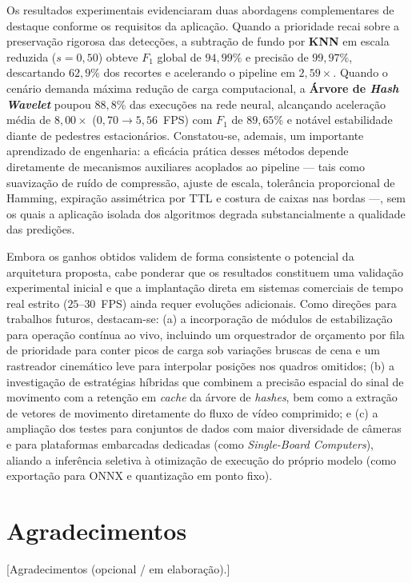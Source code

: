 \documentclass{ieeeaccess}
\begin{document}
Os resultados experimentais evidenciaram duas abordagens complementares de destaque conforme os requisitos da aplicação. Quando a prioridade recai sobre a preservação rigorosa das detecções, a subtração de fundo por \textbf{KNN} em escala reduzida ($s=0{,}50$) obteve $F_1$ global de $94{,}99\%$ e precisão de $99{,}97\%$, descartando $62{,}9\%$ dos recortes e acelerando o pipeline em $2{,}59\times$. Quando o cenário demanda máxima redução de carga computacional, a \textbf{Árvore de \textit{Hash Wavelet}} poupou $88{,}8\%$ das execuções na rede neural, alcançando aceleração média de $8{,}00\times$ ($0{,}70 \to 5{,}56$~FPS) com $F_1$ de $89{,}65\%$ e notável estabilidade diante de pedestres estacionários. Constatou-se, ademais, um importante aprendizado de engenharia: a eficácia prática desses métodos depende diretamente de mecanismos auxiliares acoplados ao pipeline --- tais como suavização de ruído de compressão, ajuste de escala, tolerância proporcional de Hamming, expiração assimétrica por TTL e costura de caixas nas bordas ---, sem os quais a aplicação isolada dos algoritmos degrada substancialmente a qualidade das predições.

Embora os ganhos obtidos validem de forma consistente o potencial da arquitetura proposta, cabe ponderar que os resultados constituem uma validação experimental inicial e que a implantação direta em sistemas comerciais de tempo real estrito ($25$--$30$~FPS) ainda requer evoluções adicionais. Como direções para trabalhos futuros, destacam-se: (a) a incorporação de módulos de estabilização para operação contínua ao vivo, incluindo um orquestrador de orçamento por fila de prioridade para conter picos de carga sob variações bruscas de cena e um rastreador cinemático leve para interpolar posições nos quadros omitidos; (b) a investigação de estratégias híbridas que combinem a precisão espacial do sinal de movimento com a retenção em \textit{cache} da árvore de \textit{hashes}, bem como a extração de vetores de movimento diretamente do fluxo de vídeo comprimido; e (c) a ampliação dos testes para conjuntos de dados com maior diversidade de câmeras e para plataformas embarcadas dedicadas (como \textit{Single-Board Computers}), aliando a inferência seletiva à otimização de execução do próprio modelo (como exportação para ONNX e quantização em ponto fixo).

\section*{Agradecimentos}
[Agradecimentos (opcional / em elaboração).]




\EOD
\end{document}
